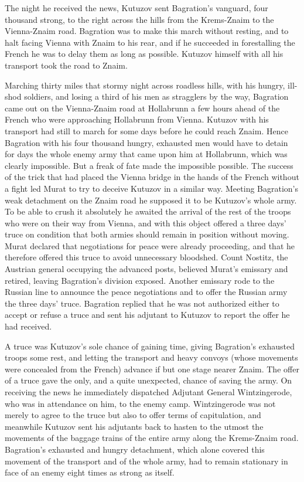 The night he received the news, Kutuzov sent Bagration's
vanguard, four thousand strong, to the right across the hills
from the Krems-Znaim to the Vienna-Znaim road. Bagration was to
make this march without resting, and to halt facing Vienna with
Znaim to his rear, and if he succeeded in forestalling the French
he was to delay them as long as possible.  Kutuzov himself with
all his transport took the road to Znaim.

Marching thirty miles that stormy night across roadless hills,
with his hungry, ill-shod soldiers, and losing a third of his men
as stragglers by the way, Bagration came out on the Vienna-Znaim
road at Hollabrunn a few hours ahead of the French who were
approaching Hollabrunn from Vienna. Kutuzov with his transport
had still to march for some days before he could reach
Znaim. Hence Bagration with his four thousand hungry, exhausted
men would have to detain for days the whole enemy army that came
upon him at Hollabrunn, which was clearly impossible. But a freak
of fate made the impossible possible. The success of the trick
that had placed the Vienna bridge in the hands of the French
without a fight led Murat to try to deceive Kutuzov in a similar
way. Meeting Bagration's weak detachment on the Znaim road he
supposed it to be Kutuzov's whole army. To be able to crush it
absolutely he awaited the arrival of the rest of the troops who
were on their way from Vienna, and with this object offered a
three days' truce on condition that both armies should remain in
position without moving. Murat declared that negotiations for
peace were already proceeding, and that he therefore offered this
truce to avoid unnecessary bloodshed. Count Nostitz, the Austrian
general occupying the advanced posts, believed Murat's emissary
and retired, leaving Bagration's division exposed. Another
emissary rode to the Russian line to announce the peace
negotiations and to offer the Russian army the three days'
truce. Bagration replied that he was not authorized either to
accept or refuse a truce and sent his adjutant to Kutuzov to
report the offer he had received.

A truce was Kutuzov's sole chance of gaining time, giving
Bagration's exhausted troops some rest, and letting the transport
and heavy convoys (whose movements were concealed from the
French) advance if but one stage nearer Znaim. The offer of a
truce gave the only, and a quite unexpected, chance of saving the
army. On receiving the news he immediately dispatched Adjutant
General Wintzingerode, who was in attendance on him, to the enemy
camp. Wintzingerode was not merely to agree to the truce but also
to offer terms of capitulation, and meanwhile Kutuzov sent his
adjutants back to hasten to the utmost the movements of the
baggage trains of the entire army along the Krems-Znaim
road. Bagration's exhausted and hungry detachment, which alone
covered this movement of the transport and of the whole army, had
to remain stationary in face of an enemy eight times as strong as
itself.

